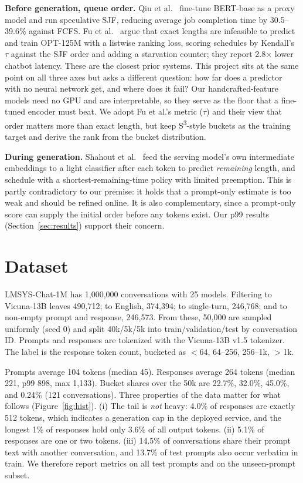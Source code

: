 \documentclass[10pt,twocolumn]{article}
\begin{document}
\textbf{Before generation, queue order.} Qiu et al.\ \cite{qiu2024ssjf} fine-tune BERT-base as a proxy model and run speculative SJF, reducing average job completion time by 30.5--39.6\% against FCFS. Fu et al.\ \cite{fu2024ltr} argue that exact lengths are infeasible to predict and train OPT-125M with a listwise ranking loss, scoring schedules by Kendall's $\tau$ against the SJF order and adding a starvation counter; they report 2.8$\times$ lower chatbot latency. These are the closest prior systems. This project sits at the same point on all three axes but asks a different question: how far does a predictor with no neural network get, and where does it fail? Our handcrafted-feature models need no GPU and are interpretable, so they serve as the floor that a fine-tuned encoder must beat. We adopt Fu et al.'s metric ($\tau$) and their view that order matters more than exact length, but keep S\textsuperscript{3}-style buckets as the training target and derive the rank from the bucket distribution.

\textbf{During generation.} Shahout et al.\ \cite{shahout2025trail} feed the serving model's own intermediate embeddings to a light classifier after each token to predict \emph{remaining} length, and schedule with a shortest-remaining-time policy with limited preemption. This is partly contradictory to our premise: it holds that a prompt-only estimate is too weak and should be refined online. It is also complementary, since a prompt-only score can supply the initial order before any tokens exist. Our p99 results (Section~\ref{sec:results}) support their concern.

\section{Dataset}
LMSYS-Chat-1M \cite{lmsys1m} has 1{,}000{,}000 conversations with 25 models. Filtering to Vicuna-13B leaves 490{,}712; to English, 374{,}394; to single-turn, 246{,}768; and to non-empty prompt and response, 246{,}573. From these, 50{,}000 are sampled uniformly (seed 0) and split 40k/5k/5k into train/validation/test by conversation ID. Prompts and responses are tokenized with the Vicuna-13B v1.5 tokenizer. The label is the response token count, bucketed as $<$64, 64--256, 256--1k, $>$1k.

Prompts average 104 tokens (median 45). Responses average 264 tokens (median 221, p99 898, max 1{,}133). Bucket shares over the 50k are 22.7\%, 32.0\%, 45.0\%, and 0.24\% (121 conversations). Three properties of the data matter for what follows (Figure~\ref{fig:hist}). (i) The tail is \emph{not} heavy: 4.0\% of responses are exactly 512 tokens, which indicates a generation cap in the deployed service, and the longest 1\% of responses hold only 3.6\% of all output tokens. (ii) 5.1\% of responses are one or two tokens. (iii) 14.5\% of conversations share their prompt text with another conversation, and 13.7\% of test prompts also occur verbatim in train. We therefore report metrics on all test prompts and on the unseen-prompt subset.
\end{document}
